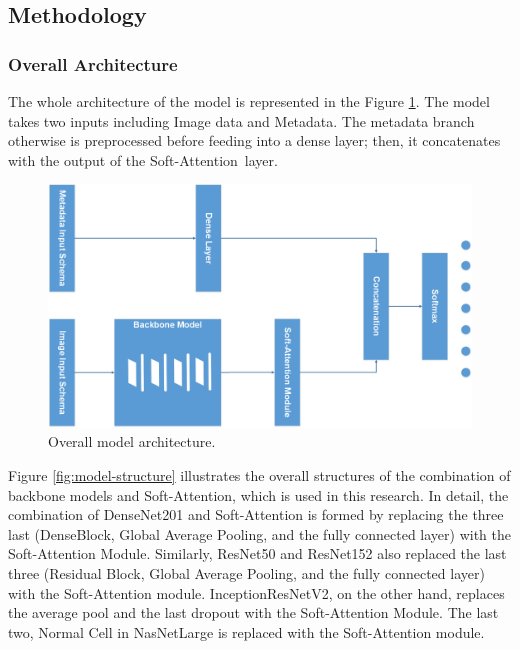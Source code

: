 \documentclass[sensors,article,accept,pdftex,moreauthors]{Definitions/mdpi}
\begin{document}
	\subsection{Methodology}
	\subsubsection{Overall Architecture}
	The whole architecture of the model is represented in the Figure \ref{fig:main-model}. The model takes two inputs including Image data and Metadata. The metadata branch otherwise is preprocessed before feeding into a dense layer; then, it concatenates with the output of the Soft-Attention~layer. 
	
	\begin{figure}[H]
		\includegraphics[width=0.9\linewidth]{Definitions/MainModel - Model Form}
		\caption{Overall model architecture.}
		\label{fig:main-model}
	\end{figure}
	
	Figure \ref{fig:model-structure} illustrates the overall structures of the combination of backbone models and Soft-Attention, which is used in this research. In detail, the combination of DenseNet201 and Soft-Attention is formed by replacing the three last (DenseBlock, Global Average Pooling, and the fully connected layer) with the Soft-Attention Module. Similarly, ResNet50 and ResNet152 also replaced the last three (Residual Block, Global Average Pooling, and the fully connected layer) with the Soft-Attention module. InceptionResNetV2, on the other hand, replaces the average pool and the last dropout with the Soft-Attention Module. The last two, Normal Cell in NasNetLarge is replaced with the Soft-Attention module. 
	
\end{document}
